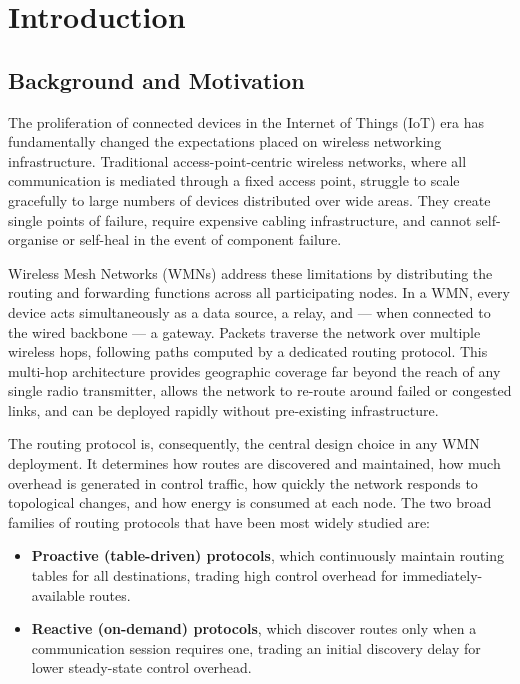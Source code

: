 \chapter{Introduction}
\label{ch:introduction}

\section{Background and Motivation}

The proliferation of connected devices in the Internet of Things (IoT) era has
fundamentally changed the expectations placed on wireless networking infrastructure.
Traditional access-point-centric wireless networks, where all communication is mediated
through a fixed access point, struggle to scale gracefully to large numbers of devices
distributed over wide areas. They create single points of failure, require expensive
cabling infrastructure, and cannot self-organise or self-heal in the event of component
failure.

Wireless Mesh Networks (WMNs) address these limitations by distributing the routing
and forwarding functions across all participating nodes. In a WMN, every device acts
simultaneously as a data source, a relay, and --- when connected to the wired backbone
--- a gateway. Packets traverse the network over multiple wireless hops, following paths
computed by a dedicated routing protocol. This multi-hop architecture provides geographic
coverage far beyond the reach of any single radio transmitter, allows the network to
re-route around failed or congested links, and can be deployed rapidly without
pre-existing infrastructure.

The routing protocol is, consequently, the central design choice in any WMN deployment.
It determines how routes are discovered and maintained, how much overhead is generated
in control traffic, how quickly the network responds to topological changes, and how
energy is consumed at each node. The two broad families of routing protocols that have
been most widely studied are:

\begin{itemize}
  \item \textbf{Proactive (table-driven) protocols}, which continuously maintain routing
    tables for all destinations, trading high control overhead for immediately-available routes.
  \item \textbf{Reactive (on-demand) protocols}, which discover routes only when a
    communication session requires one, trading an initial discovery delay for lower
    steady-state control overhead.
\end{itemize}

